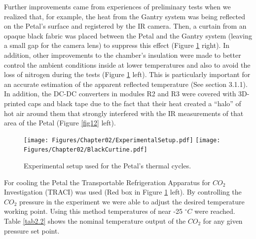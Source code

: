 		Further improvements came from experiences of preliminary tests when we realized that, for example, the heat from the Gantry system was being reflected on the Petal's surface and registered by the IR camera. Then, a curtain from an opaque black fabric was placed between the Petal and the Gantry system (leaving a small gap for the camera lens) to suppress this effect (Figure \ref{fig2.7} right). In addition, other improvements to the chamber's insulation were made to better control the ambient conditions inside at lower temperatures and also to avoid the loss of nitrogen during the tests (Figure \ref{fig2.7} left). This is particularly important for an accurate estimation of the apparent reflected temperature (See section 3.1.1). In addition, the DC-DC converters in modules R2 and R3 were covered with 3D-printed caps and black tape due to the fact that their heat created a “halo” of hot air around them that strongly interfered with the IR measurements of that area of the Petal (Figure \ref{fig12} left).
		
		\begin{figure}[ht!]
			\centering
			\captionsetup{justification=centering,margin=2cm}
			\texttt{[image: Figures/Chapter02/ExperimentalSetup.pdf]}
			\texttt{[image: Figures/Chapter02/BlackCurtine.pdf]}
			\caption{Experimental setup used for the Petal's thermal cycles.}\label{fig2.7}
		\end{figure}
		
		For cooling the Petal the Transportable Refrigeration Apparatus for $CO_{2}$ Investigation (TRACI) was used (Red box in Figure \ref{fig2.7} left). By controlling the $CO_{2}$ pressure in the experiment we were able to adjust the desired temperature working point. Using this method temperatures of near -25 $^{\circ}C$ were reached. Table \ref{tab2.2} shows the nominal temperature output of the $CO_{2}$ for any given pressure set point.
		

